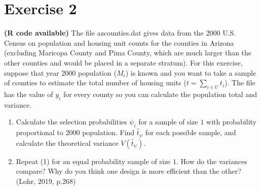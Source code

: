 \documentclass[12pt]{article}
\begin{document}
\section*{Exercise 2}
\textbf{\color{ForestGreen}(R code available)} The file azcounties.dat gives data from the 2000 U.S. Census on population and housing unit counts for the counties in Arizona (excluding Maricopa County and
Pima County, which are much larger than the other counties and would be placed in a separate stratum). For this exercise, suppose that year 2000 population ($M_i$) is known and you want to take a sample of counties to estimate the total number of housing units ($t =\sum_{i \in U} t_i$). The file has the value of $y_i$ for every county so you can calculate the population total and variance.
\begin{enumerate}
\item Calculate the selection probabilities $\psi_i$ for a sample of size $1$ with probability
proportional to 2000 population. Find $\hat{t}_\psi$ for each possible sample, and calculate
the theoretical variance $V(\hat{t}_\psi)$.
\item Repeat (1) for an equal probability sample of size $1$. How do the variances compare?
Why do you think one design is more efficient than the other? \hfill (Lohr, 2019, p.268)\end{enumerate}
\end{document}
